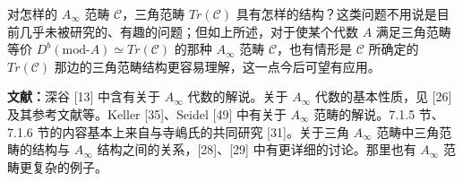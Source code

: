 对怎样的 $A_\infty$ 范畴 $\mathcal C$，三角范畴 $Tr(\mathcal C)$ 具有怎样的结构？这类问题不用说是目前几乎未被研究的、有趣的问题；但如上所述，对于使某个代数 $A$ 满足三角范畴等价 $D^{b}(\mathrm{mod}\text{-}A)\simeq Tr(\mathcal C)$ 的那种 $A_\infty$ 范畴 $\mathcal C$，也有情形是 $\mathcal C$ 所确定的 $Tr(\mathcal C)$ 那边的三角范畴结构更容易理解，这一点今后可望有应用。

\medskip
\noindent\textbf{文献：}深谷 [13] 中含有关于 $A_\infty$ 代数的解说。关于 $A_\infty$ 代数的基本性质，见 [26] 及其参考文献等。Keller [35]、Seidel [49] 中有关于 $A_\infty$ 范畴的解说。7.1.5 节、7.1.6 节的内容基本上来自与寺嶋氏的共同研究 [31]。关于三角 $A_\infty$ 范畴中三角范畴的结构与 $A_\infty$ 结构之间的关系，[28]、[29] 中有更详细的讨论。那里也有 $A_\infty$ 范畴更复杂的例子。
